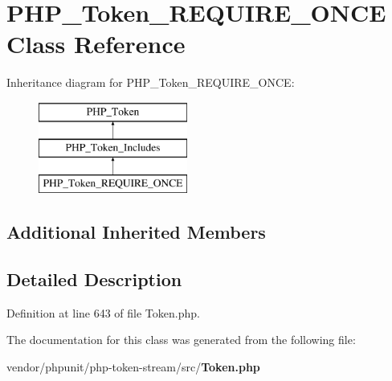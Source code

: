 \section{P\+H\+P\+\_\+\+Token\+\_\+\+R\+E\+Q\+U\+I\+R\+E\+\_\+\+O\+N\+C\+E Class Reference}
\label{class_p_h_p___token___r_e_q_u_i_r_e___o_n_c_e}
Inheritance diagram for P\+H\+P\+\_\+\+Token\+\_\+\+R\+E\+Q\+U\+I\+R\+E\+\_\+\+O\+N\+C\+E\+:\begin{figure}[H]
\begin{center}
\leavevmode
\includegraphics[height=3.000000cm]{class_p_h_p___token___r_e_q_u_i_r_e___o_n_c_e}
\end{center}
\end{figure}
\subsection*{Additional Inherited Members}


\subsection{Detailed Description}


Definition at line 643 of file Token.\+php.



The documentation for this class was generated from the following file\+:\begin{DoxyCompactItemize}
\item 
vendor/phpunit/php-\/token-\/stream/src/{\bf Token.\+php}\end{DoxyCompactItemize}
